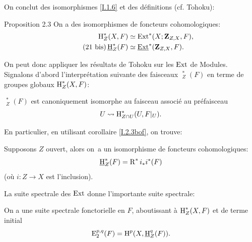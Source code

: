 On conclut des isomorphismes \ref{I.1.6} et des d\'efinitions (cf. Tohoku):

\label{I.2.3bis}
\begin{enonce*}{Proposition 2.3}
On a des isomorphismes de foncteurs cohomologiques:
\begin{align} \label{eq:I.21}
\operatorname{H}_Z^*(X, F)&\simeq \operatorname{Ext}^*(X; \mathbf{Z}_{Z, X}, F),\\
\label{eq:I.21bis}\tag{21 bis}
\mathop{\underline{\mathrm{H}}}\nolimits_Z^*(F)&\simeq \mathop{\underline{\mathrm{Ext}}}\nolimits^*(\mathbf{Z}_{Z, X}, F).
\end{align}
\end{enonce*}

On peut donc appliquer les r\'esultats de Tohoku sur les $\operatorname{Ext}$ de Modules. Signalons d'abord l'interpr\'etation suivante des faisceaux $\mathop{\underline{\mathrm{H}}}\nolimits_Z^*(F)$ en terme de groupes globaux $\operatorname{H}_Z^*(X, F)$:

\begin{corollaire} \label{I.2.4}
$\mathop{\underline{\mathrm{H}}}\nolimits_Z^*(F)$ est canoniquement isomorphe au faisceau associ\'e au pr\'efaisceau
$$
U \rightsquigarrow \operatorname{H}^*_{Z\cap U}(U, F|_{U}).
$$
\end{corollaire}

En particulier, en utilisant \ignorespaces corollaire \ref{I.2.3bof}, on trouve:

\begin{corollaire} \label{I.2.5}
Supposons $Z$ ouvert, alors on~a un isomorphisme de foncteurs cohomologiques:
\begin{equation} \label{eq:I.22} {\mathop{\underline{\mathrm{H}}}\nolimits_Z^*(F)=\operatorname{R}^*i_*i^*(F)}
\end{equation}
(o\`u $i: Z \to X$ est l'inclusion).
\end{corollaire}

La suite spectrale des $\operatorname{Ext}$ donne l'importante suite spectrale:

\begin{theoreme} \label{I.2.6} On a une suite spectrale fonctorielle en $F$, aboutissant \`a $\operatorname{H}_Z^*(X, F)$ et de terme initial
\begin{equation} \label{eq:I.23} { \operatorname{E}_2^{p, q}(F)=\operatorname{H}^p(X, \mathop{\underline{\mathrm{H}}}\nolimits_Z^q(F))}.
\end{equation}
\end{theoreme}



